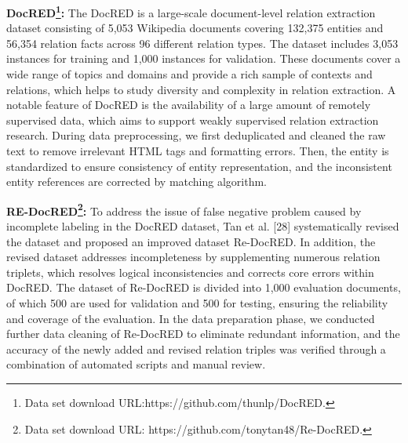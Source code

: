 \documentclass[preprint,12pt]{elsarticle}
\begin{document}
{\bf{DocRED\footnote{Data set download URL:https://github.com/thunlp/DocRED.}:}} The DocRED is a large-scale document-level relation extraction dataset consisting of 5,053 Wikipedia documents covering 132,375 entities and 56,354 relation facts across 96 different relation types. The dataset includes 3,053 instances for training and 1,000 instances for validation. These documents cover a wide range of topics and domains and provide a rich sample of contexts and relations, which helps to study diversity and complexity in relation extraction. A notable feature of DocRED is the availability of a large amount of remotely supervised data, which aims to support weakly supervised relation extraction research. During data preprocessing, we first deduplicated and cleaned the raw text to remove irrelevant HTML tags and formatting errors. Then, the entity is standardized to ensure consistency of entity representation, and the inconsistent entity references are corrected by matching algorithm.
 
{\bf{RE-DocRED\footnote{Data set download URL: https://github.com/tonytan48/Re-DocRED.}:}} To address the issue of false negative problem caused by incomplete labeling in the DocRED dataset, Tan et al. [28] systematically revised the dataset and proposed an improved dataset Re-DocRED. In addition, the revised dataset addresses incompleteness by supplementing numerous relation triplets, which resolves logical inconsistencies and corrects core errors within DocRED. The dataset of Re-DocRED is divided into 1,000 evaluation documents, of which 500 are used for validation and 500 for testing, ensuring the reliability and coverage of the evaluation. In the data preparation phase, we conducted further data cleaning of Re-DocRED to eliminate redundant information, and the accuracy of the newly added and revised relation triples was verified through a combination of automated scripts and manual review.
 
\end{document}
